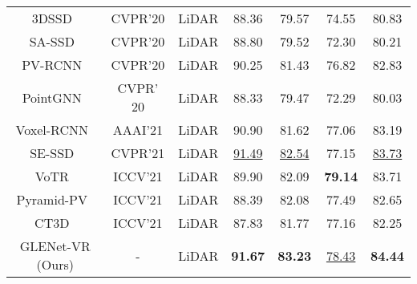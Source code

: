 \documentclass[twocolumn]{svjour3}
\begin{document}
\begin{table*}[t]
\begin{tabular}{c|c|c|cccc}
3DSSD~\citep{yang20203dssd}                   & CVPR'20                  & LiDAR                     & 88.36 & 79.57    & 74.55 & 80.83  \\
SA-SSD~\citep{He_2020_CVPR}                  & CVPR'20                  & LiDAR                     & 88.80  & 79.52    & 72.30  & 80.21  \\
PV-RCNN~\citep{shi2020pv}                 & CVPR'20                  & LiDAR                     & 90.25 & 81.43    & 76.82 & 82.83  \\
PointGNN~\citep{shi2020point}       & CVPR' 20                     & LiDAR                     & 88.33    & 79.47   & 72.29 & 80.03 \\
Voxel-RCNN~\citep{deng2021voxel}     & AAAI'21                       & LiDAR                     & 90.90     & 81.62    & 77.06    & 83.19  \\
SE-SSD~\citep{zheng2021se}                  & CVPR'21                  & LiDAR                     & \underline{91.49} & \underline{82.54}    & 77.15 & \underline{83.73}  \\
VoTR~\citep{mao2021voxel}                    & ICCV'21                  & LiDAR                     & 89.90  & 82.09    & \textbf{79.14} & 83.71  \\
Pyramid-PV~\citep{Mao_2021_ICCV}              & ICCV'21                  & LiDAR                     & 88.39 & 82.08    & 77.49 & 82.65  \\
CT3D~\citep{sheng2021improving}              & ICCV'21                  & LiDAR                     & 87.83 & 81.77    & 77.16 & 82.25  \\ 
\hline
GLENet-VR (Ours)         & -     & LiDAR                     & \textbf{91.67} & \textbf{83.23}    & \underline{78.43} & \textbf{84.44}  \\
\bottomrule
\end{tabular}
\end{table*}
\setlength{\tabcolsep}{1.5pt}
\end{document}
